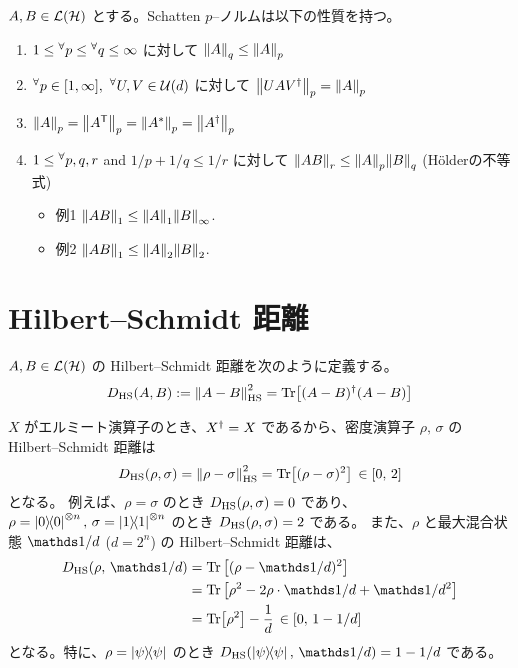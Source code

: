 $A, B \in \mathcal{L}(\mathcal{H})$ とする。Schatten $p$--ノルムは以下の性質を持つ。
\begin{enumerate}
    \item $1 \leq {}^\forall p \leq {}^\forall q \leq \infty$ に対して $\norm{A}_q \leq \norm{A}_p$
    \item ${}^\forall p \in [1, \infty],\,\,{}^\forall U,V\in\mathcal{U}(d)$ に対して $\norm{UAV^\dagger}_p = \norm{A}_p$
    \item $\norm{A}_p = \norm{A^\mathsf{T}}_p = \norm{A^*}_p = \norm{A^\dagger}_p$
    \item $1\leq {}^\forall p, q, r$ and $1/p + 1/q \leq 1/r$ に対して $\norm{AB}_r \leq \norm{A}_p \norm{B}_q$ (H\"olderの不等式)
    \begin{itemize}
        \item 例1 $\norm{AB}_1 \leq \norm{A}_1 \norm{B}_\infty$.
        \item 例2 $\norm{AB}_1 \leq \norm{A}_2 \norm{B}_2$.
    \end{itemize}
\end{enumerate}




\section{Hilbert--Schmidt 距離}
$A, B \in \mathcal{L}(\mathcal{H})$ の Hilbert--Schmidt 距離を次のように定義する。
\begin{align}
    D_{\mathrm{HS}}(A, B) := \norm{A - B}_{\mathrm{HS}}^2 = \Tr [(A - B)^\dagger(A - B)]
\end{align}

$X$ がエルミート演算子のとき、$ X^\dagger = X $ であるから、密度演算子 $\rho,\,\sigma$ の Hilbert--Schmidt 距離は
\begin{align}
    D_{\mathrm{HS}}(\rho, \sigma) = \norm{\rho - \sigma}_{\mathrm{HS}}^2 = \Tr [(\rho - \sigma )^2] \,\in [0,\,2]
\end{align}
となる。
例えば、$\rho = \sigma$ のとき $D_{\mathrm{HS}}(\rho, \sigma) = 0$ であり、$\rho = \dyad{0}\otn{n},\, \sigma = \dyad{1}\otn{n} $ のとき $D_{\mathrm{HS}}(\rho, \sigma) = 2$ である。
また、$\rho$ と最大混合状態 $\bbid/d$ ($d = 2^n$) の Hilbert--Schmidt 距離は、
\begin{align}
    D_{\HS}(\rho,\, \bbid/d) &= \Tr\qty[(\rho - \bbid/d)^2]\nonumber\\
    &= \Tr\qty[ \rho^2 - 2\rho\cdot \bbid/d + \bbid/d^2 ]\nonumber\\
    &= \Tr[\rho^2] - \frac{1}{d} \,\in [0,\, 1 - 1/d]
\end{align}
となる。特に、$\rho = \dyad{\psi}$ のとき $D_{\HS}(\dyad{\psi},\, \bbid/d) = 1 - 1/d$ である。

